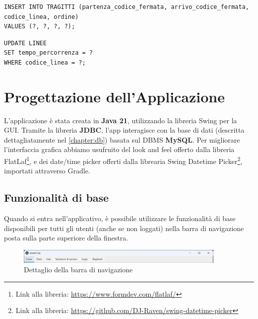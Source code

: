 \documentclass[12pt,a4paper]{report}
\begin{document}
\begin{enumerate}[label=\textbf{\arabic*)}]
\begin{lstlisting}[style=sqlstyle, caption=Inserimento tragitti \textit{Da ripetere n volte, con $n = num\_tragitti$}]
INSERT INTO TRAGITTI (partenza_codice_fermata, arrivo_codice_fermata, codice_linea, ordine)
VALUES (?, ?, ?, ?);
\end{lstlisting}
\begin{lstlisting}[style=sqlstyle, caption=Update tempo di percorrenza della linea]
UPDATE LINEE
SET tempo_percorrenza = ?
WHERE codice_linea = ?;
\end{lstlisting}

\end{enumerate}

\chapter{Progettazione dell'Applicazione}
L'applicazione è stata creata in \textbf{Java 21}, utilizzando la libreria Swing per la GUI. Tramite la libreria \textbf{JDBC}, l'app interagisce con la base di dati (descritta dettagliatamente nel \cref{chapter:db}) basata sul DBMS \textbf{MySQL}.
Per migliorare l'interfaccia grafica abbiamo usufruito del look and feel offerto dalla libreria FlatLaf\footnote{Link alla libreria: \url{https://www.formdev.com/flatlaf/}}, e dei date/time picker offerti dalla librearia Swing Datetime Picker\footnote{Link alla libreria: \url{https://github.com/DJ-Raven/swing-datetime-picker}}, importati attraverso Gradle.

\section{Funzionalità di base}
Quando si entra nell'applicativo, è possibile utilizzare le funzionalità di base disponibili per tutti gli utenti (anche se non loggati) nella barra di navigazione posta sulla parte superiore della finestra.
\\
\begin{figure}[H]
  \centering
  \includegraphics[width=0.9\textwidth]{app/Navbar}
  \caption{Dettaglio della barra di navigazione}
\end{figure}
\end{document}
